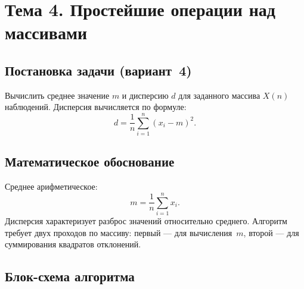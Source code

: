 \section{Тема 4. Простейшие операции над массивами}

\subsection{Постановка задачи (вариант~4)}

Вычислить среднее значение $m$ и дисперсию $d$ для заданного массива
$X(n)$ наблюдений. Дисперсия вычисляется по формуле:
\[
  d = \frac{1}{n}\sum_{i=1}^{n} (x_i - m)^2.
\]

\subsection{Математическое обоснование}

Среднее арифметическое:
\[
  m = \frac{1}{n}\sum_{i=1}^{n} x_i.
\]
Дисперсия характеризует разброс значений относительно среднего.
Алгоритм требует двух проходов по массиву: первый --- для
вычисления~$m$, второй --- для суммирования квадратов отклонений.

\subsection{Блок-схема алгоритма}

